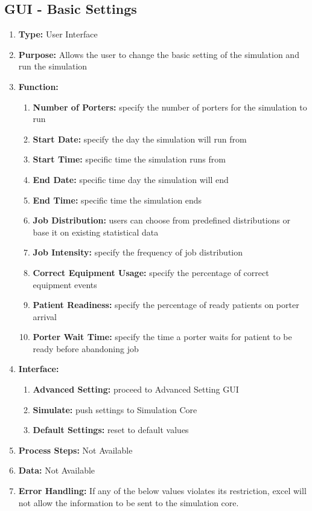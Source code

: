 \documentclass[paper=letter, fontsize=10pt]{scrartcl}
\numberwithin{equation}{section}		%
\numberwithin{figure}{section}			%
\numberwithin{table}{section}				%
\begin{document}
\subsection{GUI - Basic Settings}
\begin{enumerate}[]
	\item \textbf{Type:} User Interface
	\item \textbf{Purpose:} Allows the user to change the basic setting of the simulation and run the simulation
	\item \textbf{Function:} 
	\begin{enumerate}[]
		\item \textbf{Number of Porters:} specify the number of porters for the simulation to run
		\item \textbf{Start Date:} specify the day the simulation will run from
		\item \textbf{Start Time:} specific time the simulation runs from
		\item \textbf{End Date:} specific time day the simulation will end
		\item \textbf{End Time:} specific time the simulation ends
		\item \textbf{Job Distribution:} users can choose from predefined distributions or base it on existing statistical data
		\item \textbf{Job Intensity:} specify the frequency of job distribution
		\item \textbf{Correct Equipment Usage:} specify the percentage of correct equipment events
		\item \textbf{Patient Readiness:} specify the percentage of ready patients on porter arrival
		\item \textbf{Porter Wait Time:} specify the time a porter waits for patient to be ready before abandoning job		
	\end{enumerate}
	\item \textbf{Interface:}
		\begin{enumerate}[]
			\item \textbf{Advanced Setting:} proceed to Advanced Setting GUI
			\item \textbf{Simulate:} push settings to Simulation Core
			\item \textbf{Default Settings:} reset to default values
		\end{enumerate}
	\item \textbf{Process Steps:} Not Available
	\item \textbf{Data:} Not Available
	\item \textbf{Error Handling:} If any of the below values violates its restriction, excel will not allow the information to be sent to the simulation core.

\end{enumerate}
\end{document}
